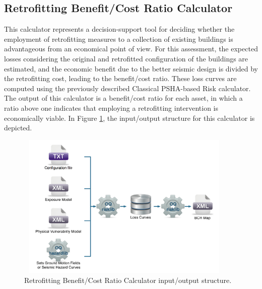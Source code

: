 \subsection{Retrofitting Benefit/Cost Ratio Calculator}
This calculator represents a decision-support tool for deciding whether the employment of retrofitting measures to a collection of existing buildings is advantageous from an economical point of view. For this assessment, the expected losses considering the original and retrofitted configuration of the buildings are estimated, and the economic benefit due to the better seismic design is divided by the retrofitting cost, leading to the benefit/cost ratio. These loss curves are computed using the previously described  Classical PSHA-based Risk calculator. The output of this calculator is a benefit/cost ratio for each asset, in which a ratio above one indicates that employing  a retrofitting intervention is economically viable. In Figure \ref{fig:BCR}, the input/output structure for this calculator is depicted.

\begin{figure}[ht]
\centering
\includegraphics[width=10.5cm,height=7cm]{figures/risk/BCR.pdf}
\caption{Retrofitting Benefit/Cost Ratio Calculator input/output structure.}
\label{fig:BCR}
\end{figure}